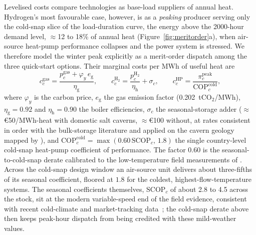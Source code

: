 Levelised costs compare technologies as base-load suppliers of annual heat.
Hydrogen's most favourable case, however, is as a \emph{peaking} producer serving
only the cold-snap slice of the load-duration curve, the energy above the
2000-hour demand level, $\approx$12 to 18\% of annual heat
(Figure~\ref{fig:meritorder}a), when air-source heat-pump performance collapses and
the power system is stressed. We therefore model the winter peak explicitly as a
merit-order dispatch among the three quick-start options. Their marginal costs per
MWh of useful heat are
%
\begin{equation}
\label{eq:peakers}
    c^{\mathrm{gas}}_{c}
        = \frac{p^{\mathrm{gas}}_{c} + \varphi_{y}\, e_{\mathrm{g}}}{\eta_{\mathrm{g}}},
    \qquad
    c^{\mathrm{H_2}}_{c}
        = \frac{p^{\mathrm{H_2}}_{c}}{\eta_{\mathrm{h}}} + \sigma_{c},
    \qquad
    c^{\mathrm{HP}}_{c}
        = \frac{\pi^{\mathrm{peak}}_{c}}{\mathrm{COP}^{\mathrm{cold}}_{c}},
\end{equation}
%
where $\varphi_{y}$ is the carbon price, $e_{\mathrm{g}}$ the gas emission factor
(0.202~tCO$_2$/MWh), $\eta_{\mathrm{g}}{=}0.92$ and $\eta_{\mathrm{h}}{=}0.90$ the
boiler efficiencies, $\sigma_{c}$ the seasonal-storage adder ($\approx$\euro{}50/MWh-heat with domestic salt
caverns, $\approx$\euro{}100 without, at rates consistent in order with the bulk-storage
literature \citep{Lord2014GeologicStorage,Papadias2021BulkStorage,Talukdar2024UHSEurope} and applied on the
cavern geology mapped by \citet{Caglayan2020caverns}), and $\mathrm{COP}^{\mathrm{cold}}_{c} =
\max(0.60\,\mathrm{SCOP}_{c},\,1.8)$ the single country-level cold-snap heat-pump
coefficient of performance. The factor $0.60$ is the seasonal-to-cold-snap derate
calibrated to the low-temperature field measurements of \citet{Gibb2023Coming}. Across the cold-snap
design window an air-source unit delivers about three-fifths of its seasonal
coefficient, floored at $1.8$ for the coldest, highest-flow-temperature systems. The
seasonal coefficients themselves, $\mathrm{SCOP}_{c}$ of about 2.8 to 4.5 across the
stock, sit at the modern variable-speed end of the field evidence, consistent with
recent cold-climate and market-tracking data~\citep{Gibb2023Coming,EHPA2024market}; the
cold-snap derate above then keeps peak-hour dispatch from being credited with these
mild-weather values.

